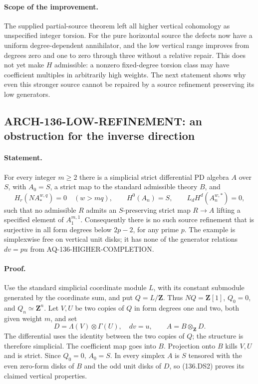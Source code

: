 \paragraph{Scope of the improvement.}
The supplied partial-source theorem left all higher vertical
cohomology as unspecified integer torsion.  For the pure horizontal
source the defects now have a uniform degree-dependent annihilator,
and the low vertical range improves from degrees zero and one to
zero through three without a relative repair.  This does not yet
make $H$ admissible: a nonzero fixed-degree torsion class may have
coefficient multiples in arbitrarily high weights.  The next
statement shows why even this stronger source cannot be repaired
by a source refinement preserving its low generators.

\subsection{ARCH-136-LOW-REFINEMENT: an obstruction for the inverse direction}
\label{sec:arch136lowrefinement}

\paragraph{Statement.}
For every integer $m\geq2$ there is a simplicial strict differential
PD algebra $A$ over $S$, with $A_0=S$, a strict map to the standard
admissible theory $B$, and
\[
 H_r(NA_*^{w,q})=0\quad(w>mq),
 \qquad H^0(A_n)=S,
 \qquad L_dH^d(A_n^{w,*})=0,                               \tag{136.LR1}
\]
such that no admissible $R$ admits an $S$-preserving strict map
$R\to A$ lifting a specified element of $A_1^{m,1}$.
Consequently there is no such source refinement that is surjective
in all form degrees below $2p-2$, for any prime $p$.
The example is simplexwise free on vertical unit disks; it has none
of the generator relations $dv=p u$ from AQ-136-HIGHER-COMPLETION.

\paragraph{Proof.}
Use the standard simplicial coordinate module $L$, with its
constant submodule generated by the coordinate sum, and put
$Q=L/\mathbf Z$.  Thus $NQ=\mathbf Z[1]$, $Q_0=0$, and
$Q_n\simeq\mathbf Z^n$.  Let $V,U$ be two copies of $Q$ in form
degrees one and two, both given weight $m$, and set
\[
 D=\Lambda(V)\otimes\Gamma(U),\quad dv=u,
 \qquad A=B\otimes_{\mathbf Z}D.                          \tag{136.LR2}
\]
The differential uses the identity between the two copies of $Q$;
the structure is therefore simplicial.  The coefficient map goes
into $B$.  Projection onto $B$ kills $V,U$ and is strict.  Since
$Q_0=0$, $A_0=S$.  In every simplex $A$ is $S$ tensored with the
even zero-form disks of $B$ and the odd unit disks of $D$, so
(136.DS2) proves its claimed vertical properties.

